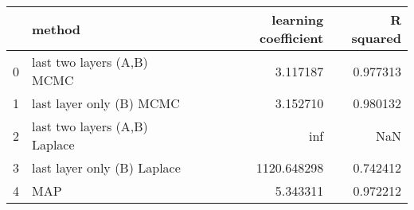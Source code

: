 \begin{tabular}{llrr}
\toprule
{} &                         method &  learning coefficient &  R squared \\
\midrule
0 &     last two layers (A,B) MCMC &              3.117187 &   0.977313 \\
1 &       last layer only (B) MCMC &              3.152710 &   0.980132 \\
2 &  last two layers (A,B) Laplace &                   inf &        NaN \\
3 &    last layer only (B) Laplace &           1120.648298 &   0.742412 \\
4 &                            MAP &              5.343311 &   0.972212 \\
\bottomrule
\end{tabular}
